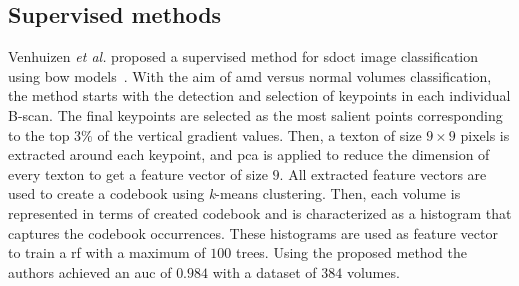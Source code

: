 \subsection{Supervised methods}

Venhuizen \textit{et al.} proposed a supervised method for \gls{sdoct} image classification using \gls{bow} models~\cite{Venhuizen2015}.
With the aim of \gls{amd} versus normal volumes classification, the method starts with the detection and selection of keypoints in each individual B-scan. %
The final keypoints are selected as the most salient points corresponding to the top $3 \%$ of the vertical gradient values.
Then, a texton of size $9 \times 9$ pixels is extracted around each keypoint, and \gls{pca} is applied to reduce the dimension of every texton to get a feature vector of size $9$.
All extracted feature vectors are used to create a codebook using \textit{k}-means clustering.
Then, each volume is represented in terms of created codebook and is characterized as a histogram that captures the codebook occurrences.
These histograms are used as feature vector to train a \gls{rf} with a maximum of $100$ trees.
Using the proposed method the authors achieved an \gls{auc} of $0.984$ with a dataset of $384$ volumes.

